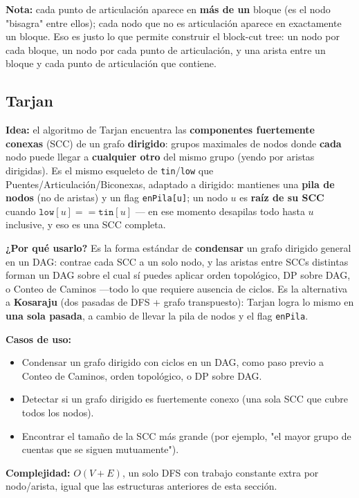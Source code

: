 \documentclass[10pt,a4paper,twocolumn]{article}
\begin{document}
\textbf{Nota:} cada punto de articulación aparece en \textbf{más de
	un} bloque (es el nodo "bisagra" entre ellos); cada nodo que no es
articulación aparece en exactamente un bloque. Eso es justo lo que
permite construir el block-cut tree: un nodo por cada bloque, un nodo
por cada punto de articulación, y una arista entre un bloque y cada
punto de articulación que contiene.


\subsection{Tarjan}

\textbf{Idea:} el algoritmo de Tarjan encuentra las \textbf{componentes
	fuertemente conexas} (SCC) de un grafo \textbf{dirigido}: grupos
maximales de nodos donde \textbf{cada} nodo puede llegar a
\textbf{cualquier otro} del mismo grupo (yendo por aristas
dirigidas). Es el mismo esqueleto de \texttt{tin}/\texttt{low} que
Puentes/Articulación/Biconexas, adaptado a dirigido: mantienes una
\textbf{pila de nodos} (no de aristas) y un flag \texttt{enPila[u]};
un nodo $u$ es \textbf{raíz de su SCC} cuando $\texttt{low}[u] ==
\texttt{tin}[u]$ — en ese momento desapilas todo hasta $u$ inclusive,
y eso es una SCC completa.

\textbf{¿Por qué usarlo?} Es la forma estándar de \textbf{condensar}
un grafo dirigido general en un DAG: contrae cada SCC a un solo nodo,
y las aristas entre SCCs distintas forman un DAG sobre el cual sí
puedes aplicar orden topológico, DP sobre DAG, o Conteo de Caminos
—todo lo que requiere ausencia de ciclos. Es la alternativa a
\textbf{Kosaraju} (dos pasadas de DFS + grafo transpuesto): Tarjan
logra lo mismo en \textbf{una sola pasada}, a cambio de llevar la
pila de nodos y el flag \texttt{enPila}.

\textbf{Casos de uso:}

\begin{itemize}
	\item Condensar un grafo dirigido con ciclos en un DAG, como paso
	previo a Conteo de Caminos, orden topológico, o DP sobre DAG.
	\item Detectar si un grafo dirigido es fuertemente conexo (una
	sola SCC que cubre todos los nodos).
	\item Encontrar el tamaño de la SCC más grande (por ejemplo,
	"el mayor grupo de cuentas que se siguen mutuamente").
\end{itemize}

\textbf{Complejidad:} $O(V + E)$, un solo DFS con trabajo constante
extra por nodo/arista, igual que las estructuras anteriores de esta
sección.
\end{document}
